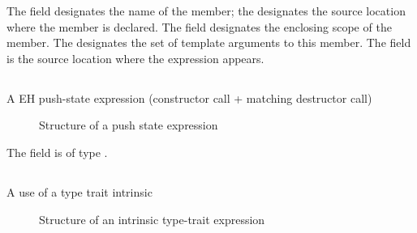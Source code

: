 The  field designates the name of the member; the  designates the source location where the member is declared.
The  field designates the enclosing scope of the member.  The  designates the set of template arguments to
this member.
The field  is the source location where the expression appears.



\subsection{}
\label{sec:ifc:ExprSort:PushState}
 A EH push-state expression (constructor call + matching destructor call)

%
\begin{figure}[H]
	\centering
	\caption{Structure of a push state expression}
	\label{fig:ifc-push-state-expression-structure}
\end{figure}
%
The  field is of type .



\subsection{}
\label{sec:ifc:ExprSort:TypeTraitIntrinsic}

A use of a type trait intrinsic

%
\begin{figure}[H]
	\centering
	\caption{Structure of an intrinsic type-trait expression}
	\label{fig:ifc-type-trait-expression-structure}
\end{figure}

